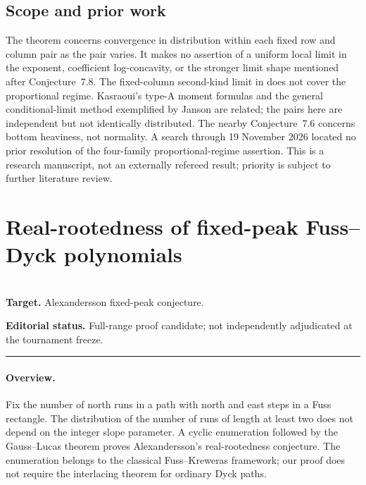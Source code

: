 \documentclass[11pt,a4paper]{article}
\begin{document}
\subsection*{Scope and prior work}
The theorem concerns convergence in distribution within each fixed row and column pair as the pair varies. It makes no assertion of a uniform local limit in the exponent, coefficient log-concavity, or the stronger limit shape mentioned after Conjecture~7.8. The fixed-column second-kind limit in \cite[Thm.~7.7]{R20H:ss} does not cover the proportional regime. Kasraoui's type-A moment formulas \cite{R20H:k} and the general conditional-limit method exemplified by Janson \cite{R20H:j} are related; the pairs here are independent but not identically distributed. The nearby Conjecture~7.6 concerns bottom heaviness, not normality. A search through 19 November 2026 located no prior resolution of the four-family proportional-regime assertion. This is a research manuscript, not an externally refereed result; priority is subject to further literature review.
\endgroup


\clearpage

\section{Real-rootedness of fixed-peak Fuss--Dyck polynomials}
\label{section:R20R}
\\[3pt]
\noindent\textbf{Target.} Alexandersson fixed-peak conjecture.

\noindent\textbf{Editorial status.} Full-range proof candidate; not independently adjudicated at the tournament freeze. 

\smallskip\hrule\medskip



\begingroup

\setcounter{equation}{0}
\renewcommand{\theequation}{\thesection.\arabic{equation}}
\renewcommand{\theHequation}{R20R.\arabic{equation}}
\paragraph{Overview.}
Fix the number of north runs in a path with north and east steps in a
Fuss rectangle. The distribution of the number of runs of length at least
two does not depend on the integer slope parameter. A cyclic enumeration
followed by the Gauss--Lucas theorem proves Alexandersson's
real-rootedness conjecture. The enumeration belongs to the
classical Fuss--Kreweras framework; our proof does not require the
interlacing theorem for ordinary Dyck paths.
\end{document}
